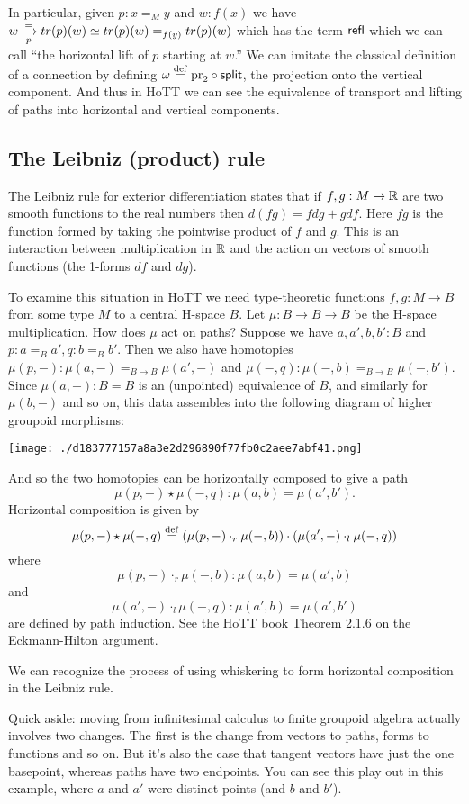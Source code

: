 In particular, given \(p:x=_M y\) and \(w:f(x)\) we have
\(w\xrightarrow[{p}]{=}tr(p)(w)\simeq tr(p)(w)=_{f(y)}tr(p)(w)\) which has the
term \(\mathsf{refl}\) which we can call ``the horizontal lift of \(p\) starting
at \(w\).'' We can imitate the classical definition of a connection by
defining \(\omega\stackrel{\mathrm{def}}{=} \mathrm{pr}_2\circ\mathsf{split}\), the projection onto
the vertical component. And thus in HoTT we can see the equivalence of
transport and lifting of paths into horizontal and vertical components.

\subsection{The Leibniz (product) rule}\label{the-leibniz-product-rule}

The Leibniz rule for exterior differentiation states that if
\(f, g:M\to \mathbb{R}\) are two smooth functions to the real numbers then
\(d(fg) = fdg + gdf\). Here \(fg\) is the function formed by taking the
pointwise product of \(f\) and \(g\). This is an interaction between
multiplication in \(\mathbb{R}\) and the action on vectors of smooth functions
(the 1-forms \(df\) and \(dg\)).

To examine this situation in HoTT we need type-theoretic functions
\(f, g:M\to B\) from some type \(M\) to a central H-space \(B\). Let
\(\mu:B\to B\to B\) be the H-space multiplication. How does \(\mu\) act
on paths? Suppose we have \(a, a', b, b':B\) and
\(p:a=_B a', q:b=_B b'\). Then we also have homotopies
\(\mu(p, -):\mu(a, -)=_{B\to B}\mu(a', -)\) and
\(\mu(-,q):\mu(-,b)=_{B\to B}\mu(-,b').\) Since \(\mu(a, -):B=B\) is an
(unpointed) equivalence of \(B\), and similarly for \(\mu(b, -)\) and so
on, this data assembles into the following diagram of higher groupoid
morphisms:

\texttt{[image: ./d183777157a8a3e2d296890f77fb0c2aee7abf41.png]}

And so the two homotopies can be horizontally composed to give a path
\[\mu(p,-)\star\mu(-,q): \mu(a, b)=\mu(a',b').\] Horizontal composition
is given by
\[\mu(p,-)\star\mu(-,q)\stackrel{\mathrm{def}}{=}(\mu(p,-)\cdot_r \mu(-,b))\cdot(\mu(a', -)\cdot_l\mu(-, q))\]
where \[\mu(p,-)\cdot_r\mu(-,b):\mu(a,b)=\mu(a',b)\] and
\[\mu(a',-)\cdot_l\mu(-,q):\mu(a',b)=\mu(a',b')\] are defined by path
induction. See the HoTT book Theorem 2.1.6 on the Eckmann-Hilton
argument\cite{hottbook}.

We can recognize the process of using whiskering to form horizontal
composition in the Leibniz rule.

Quick aside: moving from infinitesimal calculus to finite groupoid
algebra actually involves two changes. The first is the change from
vectors to paths, forms to functions and so on. But it's also the case
that tangent vectors have just the one basepoint, whereas paths have two
endpoints. You can see this play out in this example, where \(a\) and
\(a'\) were distinct points (and \(b\) and \(b'\)).


